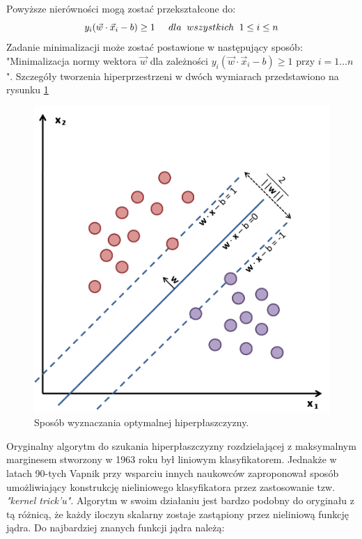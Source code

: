 Powyższe nierówności mogą zostać przekształcone do:
\begin{equation}
y_i(\vec{w}\cdot \vec{x}_i - b) \geq 1 \hspace{0.5cm} dla \hspace{0.2cm} wszystkich \hspace{0.2cm} 1 \leq i \leq n
\end{equation}
Zadanie minimalizacji może zostać postawione w następujący sposób:
"Minimalizacja normy wektora $\vec{w}$ dla zależności $y_i(\vec{w}\cdot \vec{x}_i - b) \geq 1$ przy $i=1 \ldots n$".
Szczegóły tworzenia hiperprzestrzeni w dwóch wymiarach przedstawiono na rysunku \ref{im: SvmMargin}
\begin{figure}[h]
	\includegraphics[width=12cm]{SvmMargin}
	\centering
	\caption{Sposób wyznaczania optymalnej hiperpłaszczyzny.}
	\label{im: SvmMargin}
\end{figure}

Oryginalny algorytm do szukania hiperpłaszczyzny rozdzielającej z maksymalnym marginesem stworzony w 1963 roku był liniowym klasyfikatorem. Jednakże w latach 90-tych Vapnik przy wsparciu innych naukowców zaproponował sposób umożliwiający konstrukcję nieliniowego klasyfikatora przez zastosowanie tzw. \textit{"kernel trick'u"}. Algorytm w swoim działaniu jest bardzo podobny do oryginału z tą różnicą, że każdy iloczyn skalarny zostaje zastąpiony przez nieliniową funkcję jądra. Do najbardziej znanych funkcji jądra należą:

